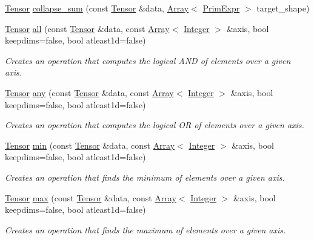 \begin{DoxyCompactItemize}
\hyperlink{classtvm_1_1te_1_1Tensor}{Tensor} \hyperlink{namespacetopi_a858c40c2e8ee578219b11a7a50287e9a}{collapse\+\_\+sum} (const \hyperlink{classtvm_1_1te_1_1Tensor}{Tensor} \&data, \hyperlink{classtvm_1_1Array}{Array}$<$ \hyperlink{classtvm_1_1PrimExpr}{Prim\+Expr} $>$ target\+\_\+shape)
\item 
\hyperlink{classtvm_1_1te_1_1Tensor}{Tensor} \hyperlink{namespacetopi_a2c8bfc6d689aaa6408964342b30fcb29}{all} (const \hyperlink{classtvm_1_1te_1_1Tensor}{Tensor} \&data, const \hyperlink{classtvm_1_1Array}{Array}$<$ \hyperlink{classtvm_1_1Integer}{Integer} $>$ \&axis, bool keepdims=false, bool atleast1d=false)
\begin{DoxyCompactList}\small\item\em Creates an operation that computes the logical A\+ND of elements over a given axis. \end{DoxyCompactList}\item 
\hyperlink{classtvm_1_1te_1_1Tensor}{Tensor} \hyperlink{namespacetopi_a97cf9d42b53193d2c9d0e157a65d25db}{any} (const \hyperlink{classtvm_1_1te_1_1Tensor}{Tensor} \&data, const \hyperlink{classtvm_1_1Array}{Array}$<$ \hyperlink{classtvm_1_1Integer}{Integer} $>$ \&axis, bool keepdims=false, bool atleast1d=false)
\begin{DoxyCompactList}\small\item\em Creates an operation that computes the logical OR of elements over a given axis. \end{DoxyCompactList}\item 
\hyperlink{classtvm_1_1te_1_1Tensor}{Tensor} \hyperlink{namespacetopi_a97ecde12740d0c191ac029080ba9a74b}{min} (const \hyperlink{classtvm_1_1te_1_1Tensor}{Tensor} \&data, const \hyperlink{classtvm_1_1Array}{Array}$<$ \hyperlink{classtvm_1_1Integer}{Integer} $>$ \&axis, bool keepdims=false, bool atleast1d=false)
\begin{DoxyCompactList}\small\item\em Creates an operation that finds the minimum of elements over a given axis. \end{DoxyCompactList}\item 
\hyperlink{classtvm_1_1te_1_1Tensor}{Tensor} \hyperlink{namespacetopi_a0683dcc462033f8daf87f939b05f250d}{max} (const \hyperlink{classtvm_1_1te_1_1Tensor}{Tensor} \&data, const \hyperlink{classtvm_1_1Array}{Array}$<$ \hyperlink{classtvm_1_1Integer}{Integer} $>$ \&axis, bool keepdims=false, bool atleast1d=false)
\begin{DoxyCompactList}\small\item\em Creates an operation that finds the maximum of elements over a given axis. \end{DoxyCompactList}\item 

\end{DoxyCompactItemize}
